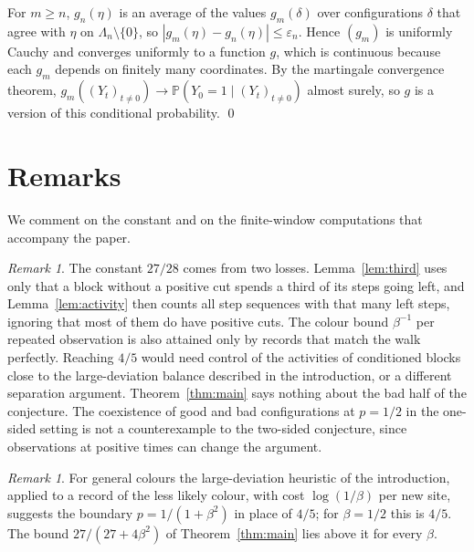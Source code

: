 \documentclass[11pt]{amsart}
\theoremstyle{remark}
\newtheorem{remark}[theorem]{Remark}
\newcommand{\PP}{\mathbb{P}}
\begin{document}
For $m\ge n$, $g_n(\eta)$ is an average of the values $g_m(\delta)$ over configurations $\delta$ that agree with $\eta$
on $\Lambda_n\setminus\{0\}$, so $|g_m(\eta)-g_n(\eta)|\le\varepsilon_n$. Hence $(g_m)$ is uniformly Cauchy and converges
uniformly to a function $g$, which is continuous because each $g_m$ depends on finitely many coordinates. By the
martingale convergence theorem, $g_m((Y_t)_{t\ne0})\to\PP(Y_0=1\mid(Y_t)_{t\ne0})$ almost surely, so $g$ is a version of
this conditional probability. \qed

\section{Remarks}\label{sec:remarks}

We comment on the constant and on the finite-window computations that accompany the paper.

\begin{remark}\label{rem:sharp}
The constant $27/28$ comes from two losses. Lemma~\ref{lem:third} uses only that a block without a positive cut spends
a third of its steps going left, and Lemma~\ref{lem:activity} then counts all step sequences with that many left steps,
ignoring that most of them do have positive cuts. The colour bound $\beta^{-1}$ per repeated observation is also
attained only by records that match the walk perfectly. Reaching $4/5$ would need control of the activities of
conditioned blocks close to the large-deviation balance described in the introduction, or a different separation
argument. Theorem~\ref{thm:main} says nothing about the bad half of the conjecture. The coexistence of good and bad
configurations at $p=1/2$ in the one-sided setting \cite[Theorem~1.3(iii)]{BdHS11} is not a counterexample to the
two-sided conjecture, since observations at positive times can change the argument.
\end{remark}

\begin{remark}\label{rem:general}
For general colours the large-deviation heuristic of the introduction, applied to a record of the less likely colour,
with cost $\log(1/\beta)$ per new site, suggests the boundary $p=1/(1+\beta^2)$ in place of $4/5$; for $\beta=1/2$ this is $4/5$. The bound
$27/(27+4\beta^2)$ of Theorem~\ref{thm:main} lies above it for every $\beta$.
\end{remark}
\end{document}
